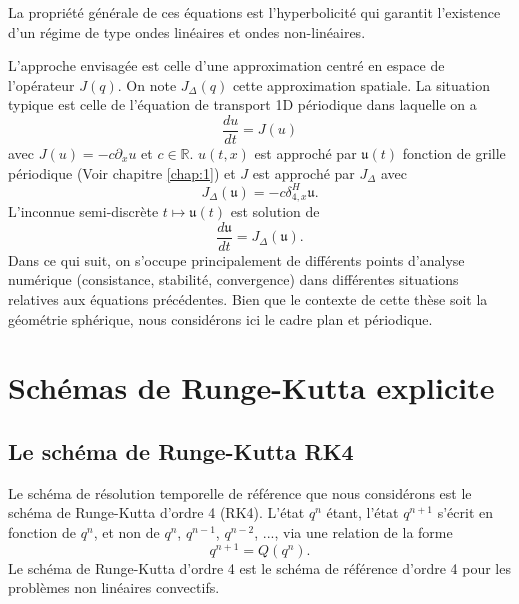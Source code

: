 La propriété générale de ces équations est l'hyperbolicité qui garantit l'existence d'un régime de type ondes linéaires et ondes non-linéaires.

L'approche envisagée est celle d'une approximation centré en espace de l'opérateur $J(q)$. On note $J_{\Delta}(q)$ cette approximation spatiale. La situation typique est celle de l'équation de transport 1D périodique dans laquelle on a
\begin{equation}
\dfrac{d u}{dt} = J (u)
\label{eq:edo}
\end{equation}
avec $J(u) = - c \partial_x u$ et $c \in \mathbb{R}$. $u(t,x)$ est approché par $\mathfrak{u}(t)$ fonction de grille périodique (Voir chapitre \ref{chap:1}) et $J$ est approché par $J_{\Delta}$ avec
\begin{equation}
J_{\Delta}(\mathfrak{u}) = - c \delta_{4,x}^H \mathfrak{u}.
\end{equation}
L'inconnue semi-discrète $t \mapsto \mathfrak{u}(t)$ est solution de 
\begin{equation}
\dfrac{d \mathfrak{u}}{dt} = J_{\Delta}(\mathfrak{u}).
\end{equation}
Dans ce qui suit, on s'occupe principalement de différents points d'analyse numérique (consistance, stabilité, convergence) dans différentes situations relatives aux équations précédentes. Bien que le contexte de cette thèse soit la géométrie sphérique, nous considérons ici le cadre plan et périodique.















\section{Schémas de Runge-Kutta explicite}

\subsection{Le schéma de Runge-Kutta RK4}

Le schéma de résolution temporelle de référence que nous considérons est le schéma de Runge-Kutta d'ordre 4 (RK4). L'état $q^n$ étant, l'état $q^{n+1}$ s'écrit en fonction de $q^n$, et non de $q^n$, $q^{n-1}$, $q^{n-2}$, ..., via une relation de la forme
\begin{equation}
q^{n+1} = Q(q^n).
\label{eq:recurrence_rk}
\end{equation}
Le schéma de Runge-Kutta d'ordre 4 est le schéma de référence d'ordre 4 pour les problèmes non linéaires convectifs. 

